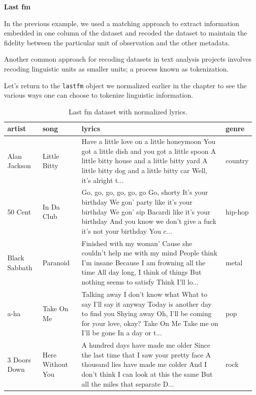 \documentclass[
  letterpaper,
]{latex/krantz}
\begin{document}
\textbf{Last fm}

In the previous example, we used a matching approach to extract
information embedded in one column of the dataset and recoded the
dataset to maintain the fidelity between the particular unit of
observation and the other metadata.

Another common approach for recoding datasets in text analysis projects
involves recoding linguistic units as smaller units; a process known as
tokenization.

Let's return to the \texttt{lastfm} object we normalized earlier in the
chapter to see the various ways one can choose to tokenize linguistic
information.

\hypertarget{tbl-td-lastfm-clean-end-lines-preview-2}{}
\begin{table}
\caption{\label{tbl-td-lastfm-clean-end-lines-preview-2}Last fm dataset with normalized lyrics. }\tabularnewline

\centering
\begin{tabular}{llll}
\toprule
artist & song & lyrics & genre\\
\midrule
Alan Jackson & Little Bitty & Have a little love on a little honeymoon You got a little dish and you got a little spoon A little bitty house and a little bitty yard A little bitty dog and a little bitty car Well, it's alright t... & country\\
50 Cent & In Da Club & Go, go, go, go, go, go Go, shorty It's your birthday We gon' party like it's your birthday We gon' sip Bacardi like it's your birthday And you know we don't give a fuck it's not your birthday You c... & hip-hop\\
Black Sabbath & Paranoid & Finished with my woman' Cause she couldn't help me with my mind People think I'm insane Because I am frowning all the time All day long, I think of things But nothing seems to satisfy Think I'll lo... & metal\\
a-ha & Take On Me & Talking away I don't know what What to say I'll say it anyway Today is another day to find you Shying away Oh, I'll be coming for your love, okay? Take On Me  Take me on  I'll be gone In a day or t... & pop\\
3 Doors Down & Here Without You & A hundred days have made me older Since the last time that I saw your pretty face A thousand lies have made me colder And I don't think I can look at this the same But all the miles that separate D... & rock\\
\bottomrule
\end{tabular}
\end{table}
\end{document}
